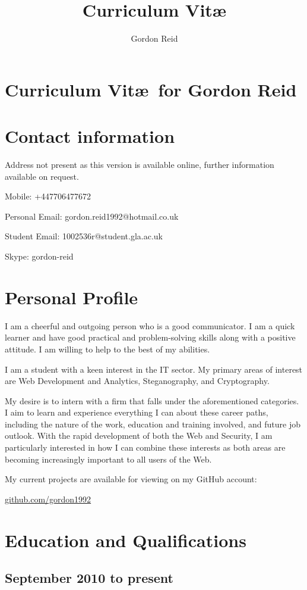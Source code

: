 \documentclass[11pt,a4paper]{article}
\title{Curriculum Vit\ae}
\author{Gordon Reid}
\begin{document}
\section*{Curriculum Vit\ae\ for Gordon Reid}
\section*{Contact information}
Address not present as this version is available online, further information
available on request.

Mobile: +447706477672

Personal Email: gordon.reid1992@hotmail.co.uk

Student Email: 1002536r@student.gla.ac.uk

Skype: gordon-reid

\section*{Personal Profile}

I am a cheerful and outgoing person who is a good communicator. I am a quick
learner and have good practical and problem-solving skills along with a
positive attitude. I am willing to help to the best of my abilities.

I am a student with a keen interest in the IT sector. My primary areas of
interest are Web Development and Analytics, Steganography, and Cryptography.

My desire is to intern with a firm that falls under the aforementioned
categories. I aim to learn and experience everything I can about these
career paths, including the nature of the work, education and training
involved, and future job outlook. With the rapid development of both the Web
and Security, I am particularly interested in how I can combine these
interests as both areas are becoming increasingly important to all users of
the Web.

My current projects are available for viewing on my GitHub account:

\url{github.com/gordon1992}

\section*{Education and Qualifications}

\subsection*{September 2010 to present}
\end{document}
